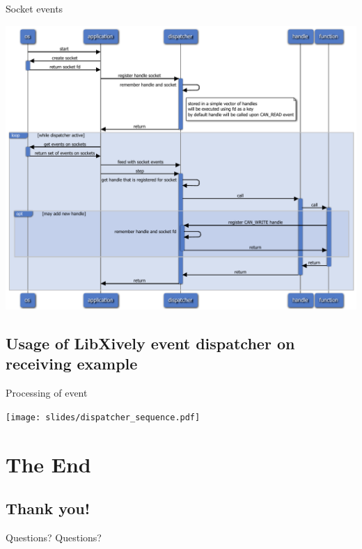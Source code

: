 \documentclass{beamer}
\begin{document}
\begin{frame}{ Socket events }
   \centerline{\includegraphics[height=0.9\textheight]{slides/socket_handles.pdf}}
\end{frame}

\subsection{ Usage of LibXively event dispatcher on receiving example }

\begin{frame}{ Processing of event }
   \centerline{\texttt{[image: slides/dispatcher\_sequence.pdf]}}
\end{frame}

\section{ The End }

\subsection{ Thank you! }

\begin{frame}{Questions?}
   Questions?
\end{frame}
\end{document}
